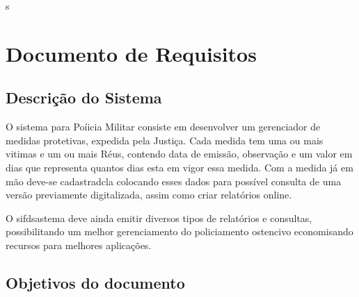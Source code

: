 \documentclass[
	12pt,				%
    oneside,			%
	a4paper,			%
	english,			%
	french,				%
	spanish,			%
	brazil,				%
	]{abntex2}
\begin{document}
\frenchspacing 


\imprimircapa

\imprimirfolhaderosto*
\tableofcontents





\tableofcontents*s
\listoffigures* %
\cleardoublepage %



\textual




\chapter{Documento de Requisitos} %
\section{Descrição do Sistema}
O sistema para Poíicia Militar consiste em desenvolver um gerenciador de medidas protetivas, expedida pela Justiça. Cada medida tem uma ou mais vitimas e um ou mais Réus, contendo data de emissão, observação e um valor em dias que representa quantos dias esta em vigor essa medida. Com a medida já em mão deve-se cadastradcla colocando esses dados para possível consulta de uma versão previamente digitalizada, assim como criar relatórios online.

O sifdsastema deve ainda emitir diversos tipos de relatórios e consultas, possibilitando um melhor gerenciamento do policiamento ostencivo economisando recursos para melhores aplicações.

\section{Objetivos do documento}
\end{document}
